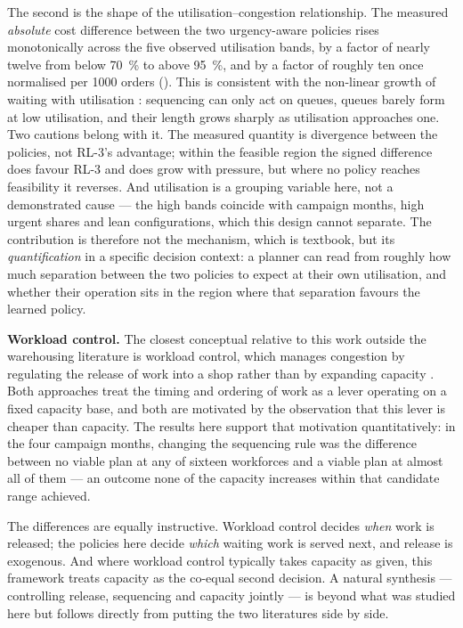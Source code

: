 The second is the shape of the utilisation--congestion relationship. The measured \emph{absolute}
cost difference between the two urgency-aware policies rises monotonically across the five
observed utilisation bands, by a factor of nearly twelve from below \SI{70}{\percent} to above
\SI{95}{\percent}, and by a factor of roughly ten once normalised per \num{1000} orders
(). This is consistent with the non-linear growth of waiting with
utilisation \citep{hopp2011}: sequencing can only act on queues, queues barely form at low
utilisation, and their length grows sharply as utilisation approaches one. Two cautions belong
with it. The measured quantity is divergence between the policies, not RL-3's advantage; within
the feasible region the signed difference does favour RL-3 and does grow with pressure, but
where no policy reaches feasibility it reverses. And utilisation is a grouping variable here,
not a demonstrated cause --- the high bands coincide with campaign months, high urgent shares
and lean configurations, which this design cannot separate. The contribution is therefore not
the mechanism, which is textbook, but its \emph{quantification} in a specific decision context:
a planner can read from  roughly how much separation between the two
policies to expect at their own utilisation, and whether their operation sits in the region
where that separation favours the learned policy.

\textbf{Workload control.} The closest conceptual relative to this work outside the warehousing
literature is workload control, which manages congestion by regulating the release of work into
a shop rather than by expanding capacity \citep{thurer2012}. Both approaches treat the timing and
ordering of work as a lever operating on a fixed capacity base, and both are motivated by the
observation that this lever is cheaper than capacity. The results here support that motivation
quantitatively: in the four campaign months, changing the sequencing rule was the difference
between no viable plan at any of sixteen workforces and a viable plan at almost all of them ---
an outcome none of the capacity increases within that candidate range achieved.

The differences are equally instructive. Workload control decides \emph{when} work is released;
the policies here decide \emph{which} waiting work is served next, and release is exogenous. And
where workload control typically takes capacity as given, this framework treats capacity as the
co-equal second decision. A natural synthesis --- controlling release, sequencing and capacity
jointly --- is beyond what was studied here but follows directly from putting the two literatures
side by side.

